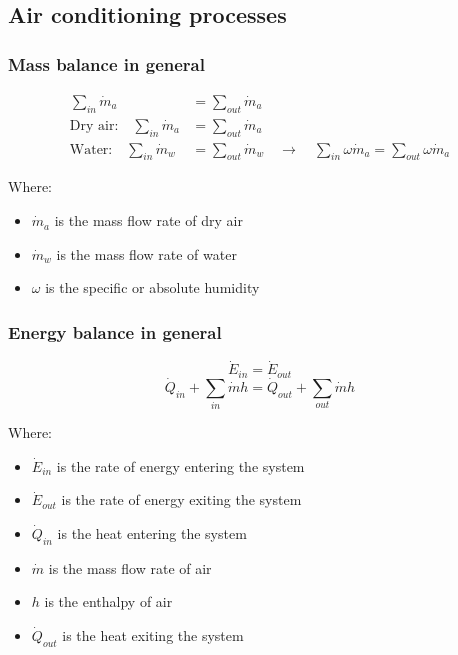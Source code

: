\documentclass[11pt]{article}
\begin{document}
\subsection{Air conditioning processes}
\label{sec:org8a6a61c}

\subsubsection{Mass balance in general}
\label{sec:orgc488a43}
\begin{align*}
\sum_{in} \dot{m}_a &= \sum_{out} \dot{m}_a \\
\text{Dry air:} \quad \sum_{in} \dot{m}_a &= \sum_{out} \dot{m}_a \\
\text{Water:} \quad \sum_{in} \dot{m}_w &= \sum_{out} \dot{m}_w \quad \rightarrow \quad \sum_{in} \omega \dot{m}_a = \sum_{out} \omega \dot{m}_a
\end{align*}

Where:
\begin{itemize}
\item \(\dot{m}_a\) is the mass flow rate of dry air
\item \(\dot{m}_w\) is the mass flow rate of water
\item \(\omega\) is the specific or absolute humidity
\end{itemize}
\subsubsection{Energy balance in general}
\label{sec:orgf2ff14c}
\[\dot{E}_{in} = \dot{E}_{out}\]
\[\dot{Q}_{in} + \sum_{in} \dot{m} h = \dot{Q}_{out} + \sum_{out} \dot{m} h\]

Where:
\begin{itemize}
\item \(\dot{E}_{in}\) is the rate of energy entering the system
\item \(\dot{E}_{out}\) is the rate of energy exiting the system
\item \(\dot{Q}_{in}\) is the heat entering the system
\item \(\dot{m}\) is the mass flow rate of air
\item \(h\) is the enthalpy of air
\item \(\dot{Q}_{out}\) is the heat exiting the system
\end{itemize}
\end{document}
